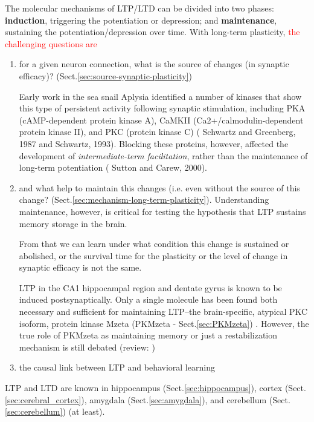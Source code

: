 The molecular mechanisms of LTP/LTD can be divided into two phases: {\bf
induction}, triggering the potentiation or depression; and {\bf maintenance},
sustaining the potentiation/depression over time. With long-term plasticity,
\textcolor{red}{the challenging questions are}
\begin{enumerate}
  \item for a given neuron connection, what is the source
  of changes (in synaptic efficacy)? (Sect.\ref{sec:source-synaptic-plasticity})

  Early work in the sea snail Aplysia identified a number of kinases that show
  this type of persistent activity following synaptic stimulation, including PKA
  (cAMP-dependent protein kinase A), CaMKII (Ca2+/calmodulin-dependent protein
  kinase II), and PKC (protein kinase C) ( Schwartz and Greenberg, 1987 and
  Schwartz, 1993). Blocking these proteins, however, affected the development of
  {\it intermediate-term facilitation}, rather than the maintenance of long-term
  potentiation ( Sutton and Carew, 2000).


  \item and what help to maintain this changes (i.e. even without the source of
  this change?   (Sect.\ref{sec:mechanism-long-term-plasticity}). Understanding
maintenance, however, is critical for testing the hypothesis that LTP sustains
memory storage in the brain.

 
  From that we can learn under what condition this change is sustained or
  abolished, or the survival time for the plasticity or the level of change in
  synaptic efficacy is not the same.

LTP in the CA1 hippocampal region and dentate gyrus is known to be induced
postsynaptically.  Only a single molecule has been found both necessary and sufficient for
  maintaining LTP--the brain-specific, atypical PKC isoform, protein kinase
  Mzeta (PKMzeta - Sect.\ref{sec:PKMzeta}) \citep{sacktor2008}.
  However, the true role of PKMzeta as maintaining memory or just a
  restabilization mechanism is still debated (review: \citep{kawapi2014})


   \item   the causal link between LTP and behavioral learning
\end{enumerate}

\begin{mdframed}
LTP and LTD are known in hippocampus (Sect.\ref{sec:hippocampus}), cortex
(Sect.\ref{sec:cerebral_cortex}), amygdala (Sect.\ref{sec:amygdala}), and
cerebellum (Sect.\ref{sec:cerebellum}) (at least).
\end{mdframed}

